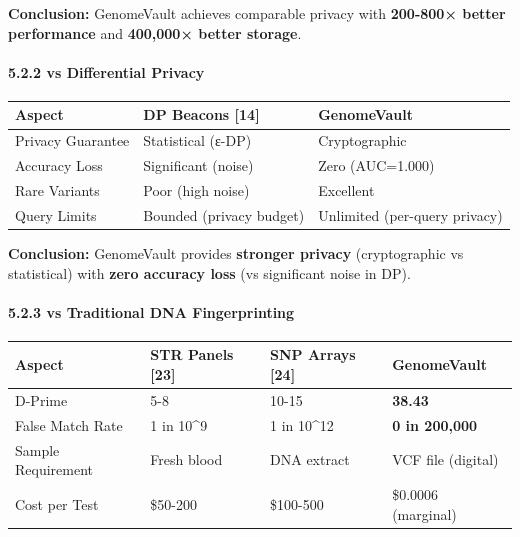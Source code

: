 \documentclass[
  11pt,
]{article}
\begin{document}
\textbf{Conclusion:} GenomeVault achieves comparable privacy with
\textbf{200-800× better performance} and \textbf{400,000× better
storage}.

\paragraph{5.2.2 vs Differential Privacy}\label{vs-differential-privacy}

\begin{longtable}[]{@{}
  >{\raggedright\arraybackslash}p{}
  >{\raggedright\arraybackslash}p{}
  >{\raggedright\arraybackslash}p{}@{}}
\toprule\noalign{}
\begin{minipage}[b]{\linewidth}\raggedright
Aspect
\end{minipage} & \begin{minipage}[b]{\linewidth}\raggedright
DP Beacons {[}14{]}
\end{minipage} & \begin{minipage}[b]{\linewidth}\raggedright
GenomeVault
\end{minipage} \\
\midrule\noalign{}
\endhead
\bottomrule\noalign{}
\endlastfoot
Privacy Guarantee & Statistical (ε-DP) & Cryptographic \\
Accuracy Loss & Significant (noise) & Zero (AUC=1.000) \\
Rare Variants & Poor (high noise) & Excellent \\
Query Limits & Bounded (privacy budget) & Unlimited (per-query
privacy) \\
\end{longtable}

\textbf{Conclusion:} GenomeVault provides \textbf{stronger privacy}
(cryptographic vs statistical) with \textbf{zero accuracy loss} (vs
significant noise in DP).

\paragraph{5.2.3 vs Traditional DNA
Fingerprinting}\label{vs-traditional-dna-fingerprinting}

\begin{longtable}[]{@{}llll@{}}
\toprule\noalign{}
Aspect & STR Panels {[}23{]} & SNP Arrays {[}24{]} & GenomeVault \\
\midrule\noalign{}
\endhead
\bottomrule\noalign{}
\endlastfoot
D-Prime & 5-8 & 10-15 & \textbf{38.43} \\
False Match Rate & 1 in 10\^{}9 & 1 in 10\^{}12 & \textbf{0 in
200,000} \\
Sample Requirement & Fresh blood & DNA extract & VCF file (digital) \\
Cost per Test & \$50-200 & \$100-500 & \$0.0006 (marginal) \\
\end{longtable}
\end{document}
